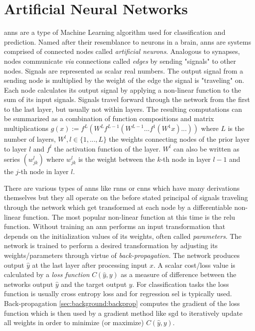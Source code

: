 \section{Artificial Neural Networks} \label{sec:background:ann}

\glspl{ann} are a type of Machine Learning algorithm used for classification and prediction. Named after their resemblance to neurons in a brain, \glspl{ann} are systems comprised of connected nodes called \textit{artificial neurons}. Analogous to synapses, nodes communicate \textit{via} connections called \textit{edges} by sending "signals" to other nodes. Signals are represented as scalar real numbers. The output signal from a sending node is multiplied by the weight of the edge the signal is "traveling" on. Each node calculates its output signal by applying a non-linear function to the sum of its input signals. Signals travel forward through the network from the first to the last layer, but usually not within layers. The resulting computations can be summarized as a combination of function compositions and matrix multiplications $g(x) := f^L(W^Lf^{L-1}(W^{L-1}...f^1(W^1x)...))$ where $L$ is the number of layers, $W^l, l \in \{1,...,L\}$ the weights connecting nodes of the prior layer to layer $l$ and $f^l$ the activation function of the layer. $W^l$ can also be written as series $(w^l_{jk})$ where $w^l_{jk}$ is the weight between the $k$-th node in layer $l-1$ and the $j$-th node in layer $l$. \par There are various types of \glspl{ann} like \glspl{rnn} or \glspl{cnn} which have many derivations themselves but they all operate on the before stated principal of signals traveling through the network which get transformed at each node by a differentiable non-linear function. The most popular non-linear function at this time is the \gls{relu} function. Without training an \gls{ann} performs an input transformation that depends on the initialization values of its weights, often called \textit{parameters}. The network is trained to perform a desired transformation by adjusting its weights/parameters through virtue of \textit{back-propagation}. The network produces output $\hat{y}$ at the last layer after processing input $x$. A scalar cost/loss value is calculated by a \textit{loss function} $C(\hat{y}, y)$ as a measure of difference between the networks output $\hat{y}$ and the target output $y$. For classification tasks the loss function is usually cross entropy loss  and for regression \gls{sel} is typically used. Back-propagation \ref{sec:background:backprop} computes the gradient of the loss function which is then used by a gradient method like \gls{sgd} to iteratively update all weights in order to minimize (or maximize) $C(\hat{y}, y)$. 

